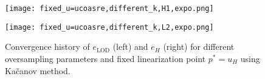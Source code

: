 \documentclass{article}
\begin{document}
\begin{figure}[ht]
    \centering
    \begin{minipage}{0.49\textwidth}
         \centering  
    \texttt{[image: fixed\_u=ucoasre,different\_k,H1,expo.png]} 
    
    
    \end{minipage}
    \hfill
    \begin{minipage}{0.49\textwidth}
       \centering  
    \texttt{[image: fixed\_u=ucoasre,different\_k,L2,expo.png]} 
     
     
    \end{minipage}
 
     \caption{Convergence history of $e_{\operatorname{LOD}}$ (left) and $e_H$ (right) for different oversampling parameters and fixed linearization point $p^{*}=u_H$ using Kačanov method.}\label{polp}
\end{figure}
\end{document}
